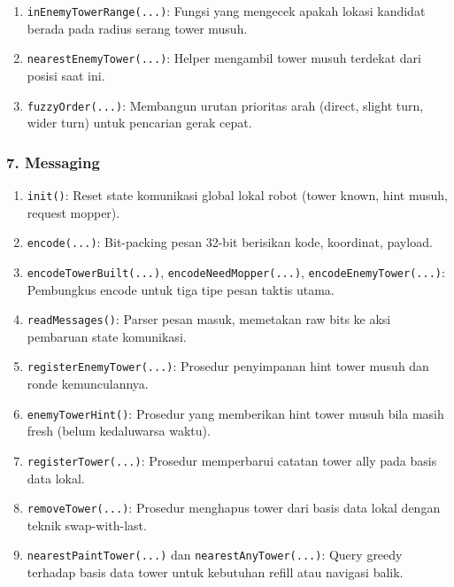 \begin{enumerate}
	\item \texttt{inEnemyTowerRange(...)}:
	      Fungsi yang mengecek apakah lokasi kandidat berada pada radius serang tower musuh.

	\item \texttt{nearestEnemyTower(...)}:
	      Helper mengambil tower musuh terdekat dari posisi saat ini.

	\item \texttt{fuzzyOrder(...)}:
	      Membangun urutan prioritas arah (direct, slight turn, wider turn) untuk pencarian gerak cepat.
\end{enumerate}

\subsubsection{7. Messaging}
\begin{enumerate}
	\item \texttt{init()}:
	      Reset state komunikasi global lokal robot (tower known, hint musuh, request mopper).

	\item \texttt{encode(...)}:
	      Bit-packing pesan 32-bit berisikan kode, koordinat, payload.

	\item \texttt{encodeTowerBuilt(...)}, \texttt{encodeNeedMopper(...)}, \texttt{encodeEnemyTower(...)}:
	      Pembungkus encode untuk tiga tipe pesan taktis utama.

	\item \texttt{readMessages()}:
	      Parser pesan masuk, memetakan raw bits ke aksi pembaruan state komunikasi.

	\item \texttt{registerEnemyTower(...)}:
	      Prosedur penyimpanan hint tower musuh dan ronde kemunculannya.

	\item \texttt{enemyTowerHint()}:
	      Prosedur yang memberikan hint tower musuh bila masih fresh (belum kedaluwarsa waktu).

	\item \texttt{registerTower(...)}:
	      Prosedur memperbarui catatan tower ally pada basis data lokal.

	\item \texttt{removeTower(...)}:
	      Prosedur menghapus tower dari basis data lokal dengan teknik swap-with-last.

	\item \texttt{nearestPaintTower(...)} dan \texttt{nearestAnyTower(...)}:
	      Query greedy terhadap basis data tower untuk kebutuhan refill atau navigasi balik.


\end{enumerate}
